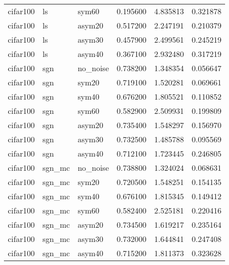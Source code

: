 \begin{table}
\begin{tabular}{lllrrr}
cifar100 & ls & sym60 & 0.195600 & 4.835813 & 0.321878 \\
cifar100 & ls & asym20 & 0.517200 & 2.247191 & 0.210379 \\
cifar100 & ls & asym30 & 0.457900 & 2.499561 & 0.245219 \\
cifar100 & ls & asym40 & 0.367100 & 2.932480 & 0.317219 \\
cifar100 & sgn & no_noise & 0.738200 & 1.348354 & 0.056647 \\
cifar100 & sgn & sym20 & 0.719100 & 1.520281 & 0.069661 \\
cifar100 & sgn & sym40 & 0.676200 & 1.805521 & 0.110852 \\
cifar100 & sgn & sym60 & 0.582900 & 2.509931 & 0.199809 \\
cifar100 & sgn & asym20 & 0.735400 & 1.548297 & 0.156970 \\
cifar100 & sgn & asym30 & 0.732500 & 1.485788 & 0.095569 \\
cifar100 & sgn & asym40 & 0.712100 & 1.723445 & 0.246805 \\
cifar100 & sgn_mc & no_noise & 0.738800 & 1.324024 & 0.068631 \\
cifar100 & sgn_mc & sym20 & 0.720500 & 1.548251 & 0.154135 \\
cifar100 & sgn_mc & sym40 & 0.676100 & 1.815345 & 0.149412 \\
cifar100 & sgn_mc & sym60 & 0.582400 & 2.525181 & 0.220416 \\
cifar100 & sgn_mc & asym20 & 0.734500 & 1.619217 & 0.235164 \\
cifar100 & sgn_mc & asym30 & 0.732000 & 1.644841 & 0.247408 \\
cifar100 & sgn_mc & asym40 & 0.715200 & 1.811373 & 0.323628 \\
\bottomrule
\end{tabular}
\end{table}
